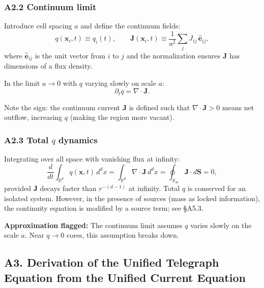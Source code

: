 \documentclass[reprint]{revtex4-2}
\begin{document}
\subsubsection{A2.2 Continuum limit}

Introduce cell spacing $a$ and define the continuum fields:
\begin{equation}
q(\mathbf{x}_i, t) \equiv q_i(t), \qquad \mathbf{J}(\mathbf{x}_i, t) \equiv \frac{1}{a^{2}}\sum_{j} J_{ij}\,\hat{\mathbf{e}}_{ij},
\end{equation}
where $\hat{\mathbf{e}}_{ij}$ is the unit vector from $i$ to $j$ and the normalization ensures $\mathbf{J}$ has dimensions of a flux density.

In the limit $a\to 0$ with $q$ varying slowly on scale $a$:
\begin{equation}
\boxed{\partial_t q = \nabla\cdot\mathbf{J}}.
\label{eq:continuity_continuum}
\end{equation}

Note the sign: the continuum current $\mathbf{J}$ is defined such that $\nabla\cdot\mathbf{J}>0$ means net outflow, increasing $q$ (making the region more vacant).

\subsubsection{A2.3 Total $q$ dynamics}

Integrating over all space with vanishing flux at infinity:
\begin{equation}
\frac{d}{dt}\int_{\mathbb{R}^d} q(\mathbf{x},t)\,d^d x = \int_{\mathbb{R}^d} \nabla\cdot\mathbf{J}\,d^d x = \oint_{S_\infty} \mathbf{J}\cdot d\mathbf{S} = 0,
\end{equation}
provided $\mathbf{J}$ decays faster than $r^{-(d-1)}$ at infinity. Total $q$ is conserved for an isolated system. However, in the presence of sources (mass as locked information), the continuity equation is modified by a source term; see \S A5.3.

\textbf{Approximation flagged:} The continuum limit assumes $q$ varies slowly on the scale $a$. Near $q\to 0$ cores, this assumption breaks down.

\subsection{A3. Derivation of the Unified Telegraph Equation from the Unified Current Equation}
\end{document}
